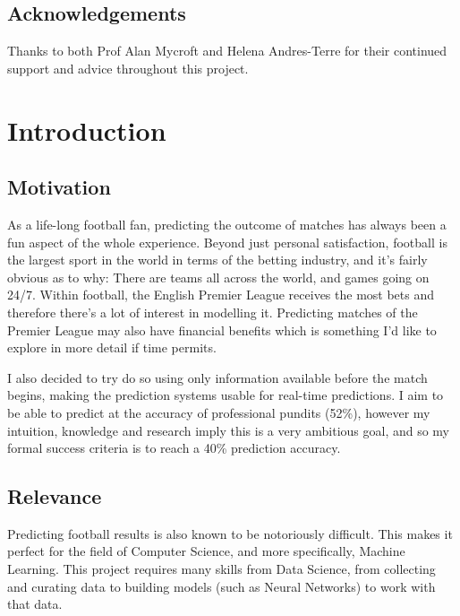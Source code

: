 \documentclass[12pt,a4paper,twoside,openright]{report}
\begin{document}
\bigskip
{}

\medskip
{}

\tableofcontents

\listoffigures

\newpage
\section*{Acknowledgements}

Thanks to both Prof Alan Mycroft and Helena Andres-Terre for their continued support and advice throughout this project.


\pagestyle{headings}

\chapter{Introduction}

\section{Motivation}

As a life-long football fan, predicting the outcome of matches has always been a fun aspect of the whole experience. Beyond just personal satisfaction, football is the largest sport in the world in terms of the betting industry, and it's fairly obvious as to why: There are teams all across the world, and games going on 24/7. Within football, the English Premier League receives the most bets and therefore there's a lot of interest in modelling it. Predicting matches of the Premier League may also have financial benefits which is something I'd like to explore in more detail if time permits.

I also decided to try do so using only information available before the match begins, making the prediction systems usable for real-time predictions. I aim to be able to predict at the accuracy of professional pundits (52\%), however my intuition, knowledge and research imply this is a very ambitious goal, and so my formal success criteria is to reach a 40\% prediction accuracy.

\section{Relevance}

Predicting football results is also known to be notoriously difficult. This makes it perfect for the field of Computer Science, and more specifically, Machine Learning. This project requires many skills from Data Science, from collecting and curating data to building models (such as Neural Networks) to work with that data.
\end{document}
